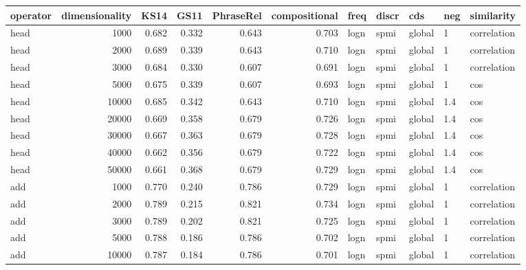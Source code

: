 \begin{tabular}{lrrrrrlllll}
\toprule
operator &  dimensionality &   KS14 &   GS11 &  PhraseRel &  compositional &  freq &  discr &     cds &  neg &     similarity \\
\midrule
    head &            1000 &  0.682 &  0.332 &      0.643 &          0.703 &  logn &   spmi &  global &    1 &    correlation \\
    head &            2000 &  0.689 &  0.339 &      0.643 &          0.710 &  logn &   spmi &  global &    1 &    correlation \\
    head &            3000 &  0.684 &  0.330 &      0.607 &          0.691 &  logn &   spmi &  global &    1 &    correlation \\
    head &            5000 &  0.675 &  0.339 &      0.607 &          0.693 &  logn &   spmi &  global &    1 &            cos \\
    head &           10000 &  0.685 &  0.342 &      0.643 &          0.710 &  logn &   spmi &  global &  1.4 &            cos \\
    head &           20000 &  0.669 &  0.358 &      0.679 &          0.726 &  logn &   spmi &  global &  1.4 &            cos \\
    head &           30000 &  0.667 &  0.363 &      0.679 &          0.728 &  logn &   spmi &  global &  1.4 &            cos \\
    head &           40000 &  0.662 &  0.356 &      0.679 &          0.722 &  logn &   spmi &  global &  1.4 &            cos \\
    head &           50000 &  0.661 &  0.368 &      0.679 &          0.729 &  logn &   spmi &  global &  1.4 &            cos \\
     add &            1000 &  0.770 &  0.240 &      0.786 &          0.729 &  logn &   spmi &  global &    1 &    correlation \\
     add &            2000 &  0.789 &  0.215 &      0.821 &          0.734 &  logn &   spmi &  global &    1 &    correlation \\
     add &            3000 &  0.789 &  0.202 &      0.821 &          0.725 &  logn &   spmi &  global &    1 &    correlation \\
     add &            5000 &  0.788 &  0.186 &      0.786 &          0.702 &  logn &   spmi &  global &    1 &    correlation \\
     add &           10000 &  0.787 &  0.184 &      0.786 &          0.701 &  logn &   spmi &  global &    1 &    correlation \\

\end{tabular}
